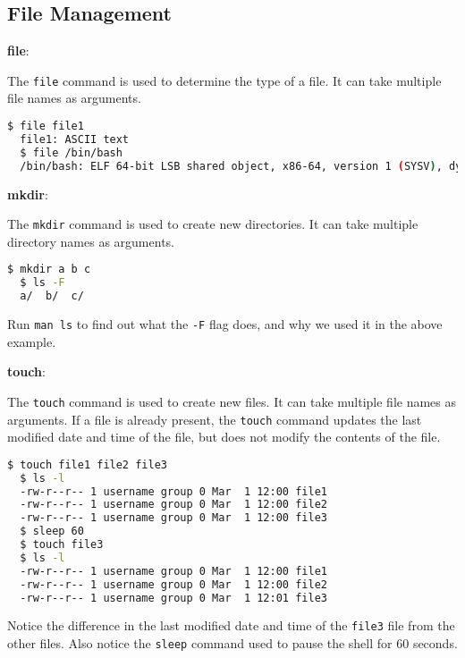 \subsection{File Management}

\textbf{file}:

The \lstinline|file| command is used to determine the type of a file.
It can take multiple file names as arguments.

\begin{lstlisting}[language=bash]
  $ file file1
  file1: ASCII text
  $ file /bin/bash
  /bin/bash: ELF 64-bit LSB shared object, x86-64, version 1 (SYSV), dynamically linked, interpreter /lib64/ld-linux-x86-64.so.2, for GNU/Linux 3.2.0, BuildID[sha1]=1234567890abcdef, stripped
\end{lstlisting}


\textbf{mkdir}:

The \lstinline|mkdir| command is used to create new directories.
It can take multiple directory names as arguments.

\begin{lstlisting}[language=bash]
  $ mkdir a b c
  $ ls -F
  a/  b/  c/
\end{lstlisting}

\begin{exercise}
  Run \lstinline|man ls| to find out what the \lstinline|-F| flag does, and why we used it in the above example.
\end{exercise}

\textbf{touch}:

The \lstinline|touch| command is used to create new files.
It can take multiple file names as arguments.
If a file is already present, the \lstinline|touch| command updates the last modified date and time of the file, but does not modify the contents of the file.

\begin{lstlisting}[language=bash]
  $ touch file1 file2 file3
  $ ls -l
  -rw-r--r-- 1 username group 0 Mar  1 12:00 file1
  -rw-r--r-- 1 username group 0 Mar  1 12:00 file2
  -rw-r--r-- 1 username group 0 Mar  1 12:00 file3
  $ sleep 60
  $ touch file3
  $ ls -l
  -rw-r--r-- 1 username group 0 Mar  1 12:00 file1
  -rw-r--r-- 1 username group 0 Mar  1 12:00 file2
  -rw-r--r-- 1 username group 0 Mar  1 12:01 file3
\end{lstlisting}

\begin{exercise}
  Notice the difference in the last modified date and time of the \lstinline|file3| file from the other files.
  Also notice the \lstinline|sleep| command used to pause the shell for 60 seconds.
\end{exercise}

